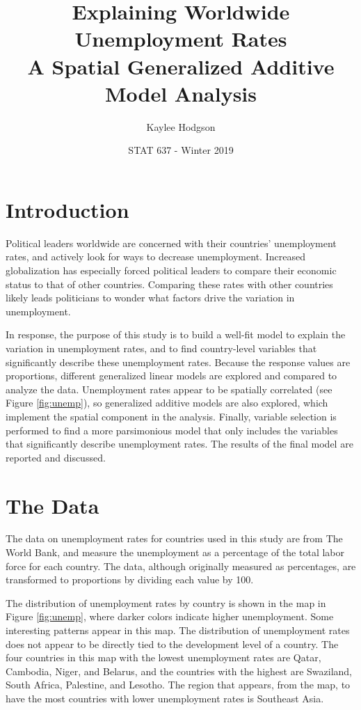 \documentclass[letterpaper,11pt]{article}
\begin{document}
\title{Explaining Worldwide Unemployment Rates \\
      \large{A Spatial Generalized Additive Model Analysis}}
\author{Kaylee Hodgson}
\date{STAT 637 - Winter 2019}

\maketitle

\section{Introduction}

Political leaders worldwide are concerned with their countries' unemployment rates, and actively look for ways to decrease unemployment. Increased globalization has especially forced political leaders to compare their economic status to that of other countries. Comparing these rates with other countries likely leads politicians to wonder what factors drive the variation in unemployment. 

In response, the purpose of this study is to build a well-fit model to explain the variation in unemployment rates, and to find country-level variables that significantly describe these unemployment rates. Because the response values are proportions, different generalized linear models are explored and compared to analyze the data. Unemployment rates appear to be spatially correlated (see Figure \ref{fig:unemp}), so generalized additive models are also explored, which implement the spatial component in the analysis. Finally, variable selection is performed to find a more parsimonious model that only includes the variables that significantly describe unemployment rates. The results of the final model are reported and discussed. 

\section{The Data}

The data on unemployment rates for countries used in this study are from The World Bank, and measure the unemployment as a percentage of the total labor force for each country. The data, although originally measured as percentages, are transformed to proportions by dividing each value by 100. 

The distribution of unemployment rates by country is shown in the map in Figure \ref{fig:unemp}, where darker colors indicate higher unemployment. Some interesting patterns appear in this map. The distribution of unemployment rates does not appear to be directly tied to the development level of a country. The four countries in this map with the lowest unemployment rates are Qatar, Cambodia, Niger, and Belarus, and the countries with the highest are Swaziland, South Africa, Palestine, and Lesotho. The region that appears, from the map, to have the most countries with lower unemployment rates is Southeast Asia.
\end{document}
